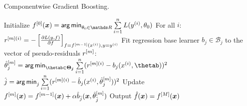 
\begin{algorithm}[H]
  \begin{footnotesize}
  \begin{center}
  \caption{Componentwise Gradient Boosting.}
    \begin{algorithmic}[1]
      \State Initialize $f^{[0]}(\xv) = \argmin_{\theta_0\in\R} \sum  \limits_{i=1}^n L(\yi, \theta_0)$
        \State For all $i$: $r^{[m](i)} = -\left[\frac{\partial{L(y, f)}}{\partial f}\right]_{f=f^{[m-1]}(x^{(i)}),y=y^{(i)}}$
          \State Fit regression base learner $b_j \in \mathcal{B}_j$ to the vector of pseudo-residuals $r^{[m]}$:
          \State $\thetamh_j = \argmin_{\thetab \in \bm{\Theta_j}} \sum  \limits_{i=1}^n
          (\rmi - b_j(\xi, \thetab))^2$
        \EndFor
        \State $\hat{j} = \mathop{\sf arg\,min}_{j} \sum  \limits_{i=1}^n (r^{[m](i)} - \hat{b}_j(x^{(i)}, \hat{\theta}^{[m]}_j))^2$
        \State Update $f^{[m]}(\bm{x}) = f^{[m-1]}(\bm{x}) + \alpha \hat{b}_{\hat{j}}(\bm{x}, \hat{\theta}^{[m]}_{\hat{j}})$
      \EndFor
      \State Output $\hat{f}(\bm{x}) = f^{[M]}(\bm{x})$
    \end{algorithmic}
    \end{center}
    \end{footnotesize}
\end{algorithm}
